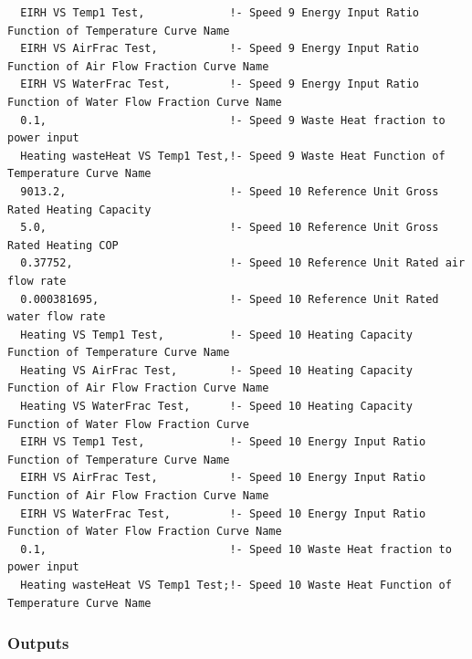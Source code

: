 \begin{lstlisting}
  EIRH VS Temp1 Test,             !- Speed 9 Energy Input Ratio Function of Temperature Curve Name
  EIRH VS AirFrac Test,           !- Speed 9 Energy Input Ratio Function of Air Flow Fraction Curve Name
  EIRH VS WaterFrac Test,         !- Speed 9 Energy Input Ratio Function of Water Flow Fraction Curve Name
  0.1,                            !- Speed 9 Waste Heat fraction to power input
  Heating wasteHeat VS Temp1 Test,!- Speed 9 Waste Heat Function of Temperature Curve Name
  9013.2,                         !- Speed 10 Reference Unit Gross Rated Heating Capacity
  5.0,                            !- Speed 10 Reference Unit Gross Rated Heating COP
  0.37752,                        !- Speed 10 Reference Unit Rated air flow rate
  0.000381695,                    !- Speed 10 Reference Unit Rated water flow rate
  Heating VS Temp1 Test,          !- Speed 10 Heating Capacity Function of Temperature Curve Name
  Heating VS AirFrac Test,        !- Speed 10 Heating Capacity Function of Air Flow Fraction Curve Name
  Heating VS WaterFrac Test,      !- Speed 10 Heating Capacity Function of Water Flow Fraction Curve
  EIRH VS Temp1 Test,             !- Speed 10 Energy Input Ratio Function of Temperature Curve Name
  EIRH VS AirFrac Test,           !- Speed 10 Energy Input Ratio Function of Air Flow Fraction Curve Name
  EIRH VS WaterFrac Test,         !- Speed 10 Energy Input Ratio Function of Water Flow Fraction Curve Name
  0.1,                            !- Speed 10 Waste Heat fraction to power input
  Heating wasteHeat VS Temp1 Test;!- Speed 10 Waste Heat Function of Temperature Curve Name
\end{lstlisting}

\subsubsection{Outputs}\label{outputs-28}

